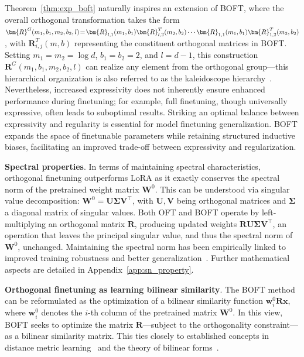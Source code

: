 Theorem~\ref{thm:exp_boft} naturally inspires an extension of BOFT, where the overall orthogonal transformation takes the form $\thickmuskip=2mu \medmuskip=2mu \bm{R}^G(m_1,b_1,m_2,b_2,l)=\bm{R}_{l,1}(m_1,b_1)\bm{R}_{l,2}^T(m_2,b_2)\cdots\bm{R}_{1,1}(m_1,b_1)\bm{R}_{1,2}^T(m_2,b_2)$, with $\bm{R}_{i,j}^T(m,b)$ representing the constituent orthogonal matrices in BOFT. Setting $m_1=m_2=\log d$, $b_1=b_2=2$, and $l=d-1$, this construction $\bm{R}^G(m_1,b_1,m_2,b_2,l)$ can realize any element from the orthogonal group—this hierarchical organization is also referred to as the kaleidoscope hierarchy~\cite{dao2019kaleidoscope}. Nevertheless, increased expressivity does not inherently ensure enhanced performance during finetuning; for example, full finetuning, though universally expressive, often leads to suboptimal results. Striking an optimal balance between expressivity and regularity is essential for model finetuning generalization. BOFT expands the space of finetunable parameters while retaining structured inductive biases, facilitating an improved trade-off between expressivity and regularization.

\textbf{Spectral properties}. In terms of maintaining spectral characteristics, orthogonal finetuning outperforms LoRA as it exactly conserves the spectral norm of the pretrained weight matrix $\bm{W}^0$. This can be understood via singular value decomposition: $\bm{W}^0 = \bm{U}\bm{\Sigma}\bm{V}^\top$, with $\bm{U}, \bm{V}$ being orthogonal matrices and $\bm{\Sigma}$ a diagonal matrix of singular values. Both OFT and BOFT operate by left-multiplying an orthogonal matrix $\bm{R}$, producing updated weights $\bm{R}\bm{U}\bm{\Sigma}\bm{V}^\top$, an operation that leaves the principal singular value, and thus the spectral norm of $\bm{W}^0$, unchanged. Maintaining the spectral norm has been empirically linked to improved training robustness and better generalization~\cite{miyato2018spectral,yoshida2017spectral}. Further mathematical aspects are detailed in Appendix~\ref{app:sn_property}.

\textbf{Orthogonal finetuning as learning bilinear similarity}. The BOFT method can be reformulated as the optimization of a bilinear similarity function $\bm{w}^0_i\bm{R}\bm{x}$, where $\bm{w}^0_i$ denotes the $i$-th column of the pretrained matrix $\bm{W}^0$. In this view, BOFT seeks to optimize the matrix $\bm{R}$—subject to the orthogonality constraint—as a bilinear similarity matrix. This ties closely to established concepts in distance metric learning~\cite{xing2002distance} and the theory of bilinear forms~\cite{roman2005advanced}.

